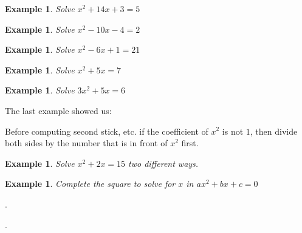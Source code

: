 \documentclass[twoside]{tufte-handout}
\newcounter{ekcounter}%
\theoremstyle{ekimcustom}
\newtheorem{exm}[ekcounter]{Example}
\begin{document}
\begin{exm}
Solve $x^2+14x+3=5$
\end{exm}
\vskip10pt


\begin{exm}
Solve $x^2-10x-4=2$
\end{exm}
\vskip10pt

\begin{exm}
Solve $x^2-6x+1=21$
\end{exm}
\vskip10pt



\begin{exm}
Solve $x^2+5x=7$
\end{exm}
\vskip10pt
\vskip10pt

\begin{exm}
Solve $3x^2+5x=6$
\end{exm}
\vskip10pt
\vskip10pt
\vskip10pt


The last example showed us:
\begin{bmethod}{}{}
Before computing second stick, etc. if the coefficient of $x^2$ is not $1$, then divide both sides by the number that is in front of $x^2$ first.
\end{bmethod}

\begin{exm}
Solve $x^2+2x=15$ two different ways.
\end{exm}

\begin{exm}
Complete the square to solve for $x$ in $ax^2+bx+c=0$
\end{exm}



.


.
\vskip10pt
\end{document}
